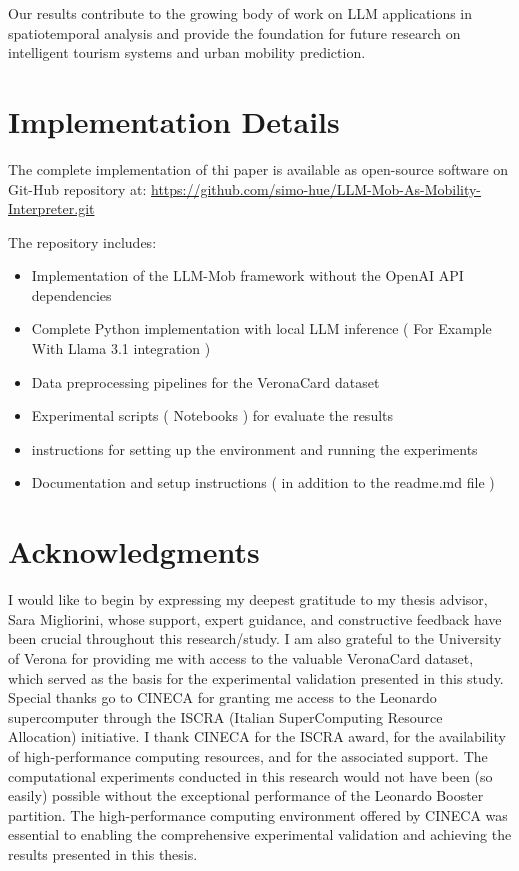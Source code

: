 \documentclass[12pt,a4paper]{article}
\begin{document}
Our results contribute to the growing body of work on LLM applications in spatiotemporal analysis and provide the foundation for future research on intelligent tourism systems and urban mobility prediction.\\

\section{Implementation Details}

The complete implementation of thi paper is available as open-source software on Git-Hub repository at:
\url{https://github.com/simo-hue/LLM-Mob-As-Mobility-Interpreter.git}

The repository includes:
\begin{itemize}
\item Implementation of the LLM-Mob framework without the OpenAI API dependencies    
\item Complete Python implementation with local LLM inference ( For Example With Llama 3.1 integration )
\item Data preprocessing pipelines for the VeronaCard dataset
\item Experimental scripts ( Notebooks ) for evaluate the results
\item instructions for setting up the environment and running the experiments
\item Documentation and setup instructions ( in addition to the readme.md file )
\end{itemize}

\section{Acknowledgments}

I would like to begin by expressing my deepest gratitude to my thesis advisor, Sara Migliorini, whose support, expert guidance, and constructive feedback have been crucial throughout this research/study. I am also grateful to the University of Verona for providing me with access to the valuable VeronaCard dataset, which served as the basis for the experimental validation presented in this study.\\

Special thanks go to CINECA for granting me access to the Leonardo supercomputer through the ISCRA (Italian SuperComputing Resource Allocation) initiative. I thank CINECA for the ISCRA award, for the availability of high-performance computing resources, and for the associated support. The computational experiments conducted in this research would not have been (so easily) possible without the exceptional performance of the Leonardo Booster partition. The high-performance computing environment offered by CINECA was essential to enabling the comprehensive experimental validation and achieving the results presented in this thesis.\\
\end{document}
